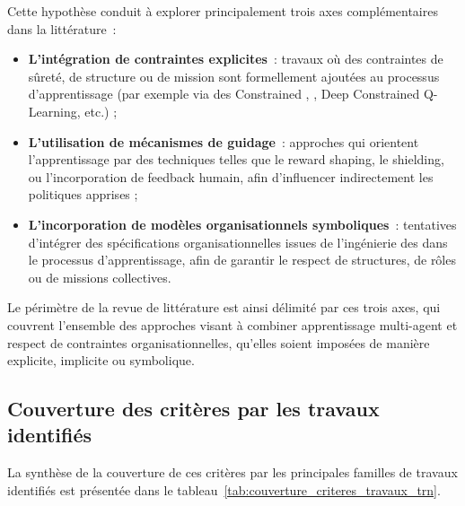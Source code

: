 Cette hypothèse conduit à explorer principalement trois axes complémentaires dans la littérature~:
\begin{itemize}
  \item \textbf{L’intégration de contraintes explicites}~: travaux où des contraintes de sûreté, de structure ou de mission sont formellement ajoutées au processus d’apprentissage (par exemple via des Constrained , , Deep Constrained Q-Learning, etc.) ;
  \item \textbf{L’utilisation de mécanismes de guidage}~: approches qui orientent l’apprentissage par des techniques telles que le reward shaping, le shielding, ou l’incorporation de feedback humain, afin d’influencer indirectement les politiques apprises ;
  \item \textbf{L’incorporation de modèles organisationnels symboliques}~: tentatives d’intégrer des spécifications organisationnelles issues de l’ingénierie des  dans le processus d’apprentissage, afin de garantir le respect de structures, de rôles ou de missions collectives.
\end{itemize}

Le périmètre de la revue de littérature est ainsi délimité par ces trois axes, qui couvrent l’ensemble des approches visant à combiner apprentissage multi-agent et respect de contraintes organisationnelles, qu’elles soient imposées de manière explicite, implicite ou symbolique.

\subsection*{Couverture des critères par les travaux identifiés}

La synthèse de la couverture de ces critères par les principales familles de travaux identifiés est présentée dans le tableau~\ref{tab:couverture_criteres_travaux_trn}.

